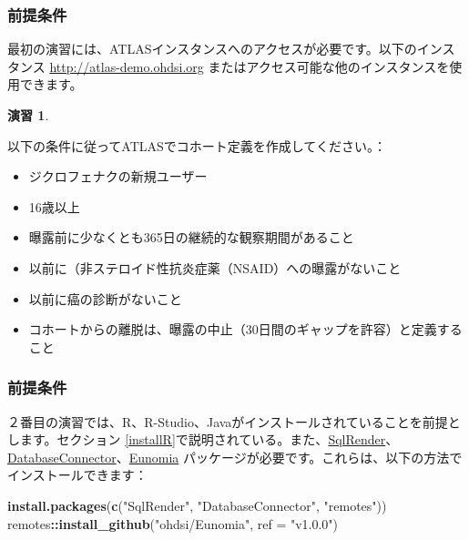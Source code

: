\documentclass[
  11pt]{book}
\newenvironment{Shaded}{\begin{snugshade}}{\end{snugshade}}
\newcommand{\AttributeTok}[1]{\textcolor[rgb]{0.13,0.29,0.53}{#1}}
\newcommand{\FunctionTok}[1]{\textcolor[rgb]{0.13,0.29,0.53}{\textbf{#1}}}
\newcommand{\NormalTok}[1]{#1}
\newcommand{\SpecialCharTok}[1]{\textcolor[rgb]{0.81,0.36,0.00}{\textbf{#1}}}
\newcommand{\StringTok}[1]{\textcolor[rgb]{0.31,0.60,0.02}{#1}}
\providecommand{\tightlist}{%
  \setlength{\itemsep}{0pt}\setlength{\parskip}{0pt}}
\theoremstyle{definition}
\theoremstyle{definition}
\theoremstyle{definition}
\newtheorem{exercise}{演習}[chapter]
\theoremstyle{definition}
\theoremstyle{remark}
\begin{document}
\subsubsection*{前提条件}\label{ux524dux63d0ux6761ux4ef6-4}

最初の演習には、ATLASインスタンスへのアクセスが必要です。以下のインスタンス \url{http://atlas-demo.ohdsi.org} またはアクセス可能な他のインスタンスを使用できます。

\begin{exercise}
\protect\hypertarget{exr:exerciseCohortsAtlas}{}\label{exr:exerciseCohortsAtlas}

以下の条件に従ってATLASでコホート定義を作成してください。：

\begin{itemize}
\tightlist
\item
  ジクロフェナクの新規ユーザー
\item
  16歳以上
\item
  曝露前に少なくとも365日の継続的な観察期間があること
\item
  以前に（非ステロイド性抗炎症薬（NSAID）への曝露がないこと
\item
  以前に癌の診断がないこと
\item
  コホートからの離脱は、曝露の中止（30日間のギャップを許容）と定義すること
\end{itemize}

\end{exercise}

\subsubsection*{前提条件}\label{ux524dux63d0ux6761ux4ef6-5}

２番目の演習では、R、R-Studio、Javaがインストールされていることを前提とします。セクション \ref{installR}で説明されている。また、\href{https://ohdsi.github.io/SqlRender/}{SqlRender}、\href{https://ohdsi.github.io/DatabaseConnector/}{DatabaseConnector}、\href{https://ohdsi.github.io/Eunomia/}{Eunomia} パッケージが必要です。これらは、以下の方法でインストールできます：

\begin{Shaded}
\begin{Highlighting}[]
\FunctionTok{install.packages}\NormalTok{(}\FunctionTok{c}\NormalTok{(}\StringTok{"SqlRender"}\NormalTok{, }\StringTok{"DatabaseConnector"}\NormalTok{, }\StringTok{"remotes"}\NormalTok{))}
\NormalTok{remotes}\SpecialCharTok{::}\FunctionTok{install\_github}\NormalTok{(}\StringTok{"ohdsi/Eunomia"}\NormalTok{, }\AttributeTok{ref =} \StringTok{"v1.0.0"}\NormalTok{)}
\end{Highlighting}
\end{Shaded}
\end{document}
